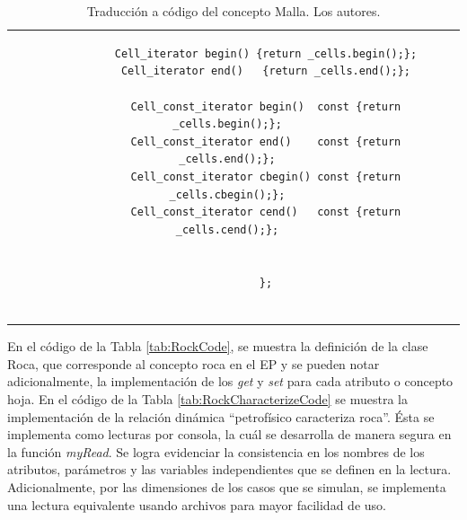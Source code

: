 \begin{table}[h!]
\begin{tabular}{cc}
\begin{tiny}
\begin{lstlisting}
			Cell_iterator begin() {return _cells.begin();};
			Cell_iterator end()   {return _cells.end();};
			
			Cell_const_iterator begin()  const {return _cells.begin();};
			Cell_const_iterator end()    const {return _cells.end();};
			Cell_const_iterator cbegin() const {return _cells.cbegin();};
			Cell_const_iterator cend()   const {return _cells.cend();};
			
			
			};
			
			\end{lstlisting}
		\end{tiny}
	\end{tabular}
	\caption[Traducción a código del concepto Malla.]{Traducción a código del concepto Malla. Los autores. \label{tab:MeshCode}}
\end{table}

\newpage

En el código de la Tabla \ref{tab:RockCode}, se muestra la definición de la clase Roca, que corresponde al concepto roca en el EP y se pueden notar adicionalmente, la implementación de los \textit{get} y \textit{set} para cada atributo o concepto hoja. En el código de la Tabla \ref{tab:RockCharacterizeCode} se muestra la implementación de la relación dinámica ``petrofísico caracteriza roca''. Ésta se implementa como lecturas por consola, la cuál se desarrolla de manera segura en la función \textit{myRead}. Se logra evidenciar la consistencia en los nombres de los atributos, parámetros y las variables independientes que se definen en la lectura. Adicionalmente, por las dimensiones de los casos que se simulan, se implementa una lectura equivalente usando archivos para mayor facilidad de uso.

